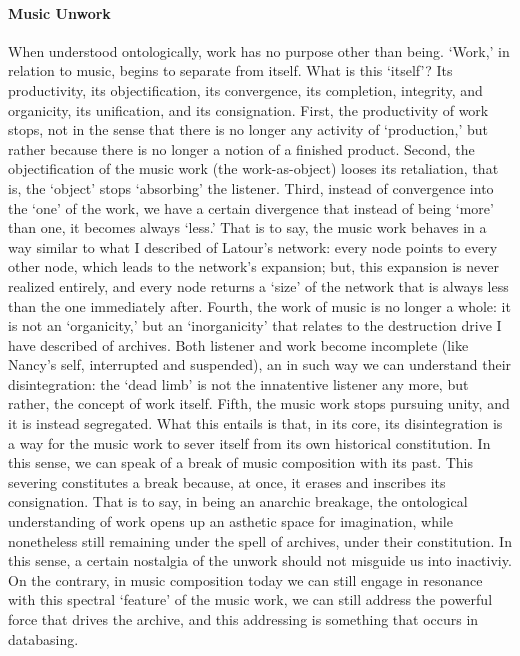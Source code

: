 \paragraph{Music Unwork}
When understood ontologically, work has no purpose other than being. `Work,' in relation to music, begins to separate from itself. What is this `itself'? Its productivity, its objectification, its convergence, its completion, integrity, and organicity, its unification, and its consignation. First, the productivity of work stops, not in the sense that there is no longer any activity of `production,' but rather because there is no longer a notion of a finished product. Second, the objectification of the music work (the work-as-object) looses its retaliation, that is, the `object' stops `absorbing' the listener. Third, instead of convergence into the `one' of the work, we have a certain divergence that instead of being `more' than one, it becomes always `less.' That is to say, the music work behaves in a way similar to what I described of Latour's network: every node points to every other node, which leads to the network's expansion; but, this expansion is never realized entirely, and every node returns a `size' of the network that is always less than the one immediately after. Fourth, the work of music is no longer a whole: it is not an `organicity,' but an `inorganicity' that relates to the destruction drive I have described of archives. Both listener and work become incomplete (like Nancy's self, interrupted and suspended), an in such way we can understand their disintegration: the `dead limb' is not the innatentive listener any more, but rather, the concept of work itself. Fifth, the music work stops pursuing unity, and it is instead segregated. What this entails is that, in its core, its disintegration is a way for the music work to sever itself from its own historical constitution. In this sense, we can speak of a break of music composition with its past. This severing constitutes a break because, at once, it erases and inscribes its consignation. That is to say, in being an anarchic breakage, the ontological understanding of work opens up an asthetic space for imagination, while nonetheless still remaining under the spell of archives, under their constitution. In this sense, a certain nostalgia of the unwork should not misguide us into inactiviy. On the contrary, in music composition today we can still engage in resonance with this spectral `feature' of the music work, we can still address the powerful force that drives the archive, and this addressing is something that occurs in databasing.

